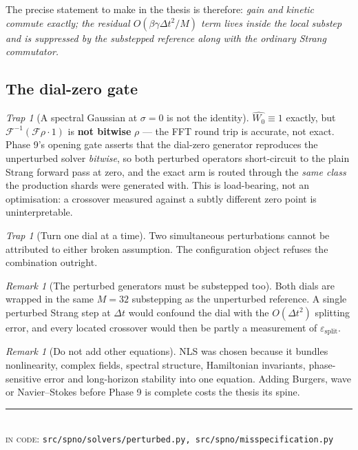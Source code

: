 \documentclass[11pt,a4paper]{article}
\theoremstyle{plain}
\theoremstyle{definition}
\theoremstyle{remark}
\newtheorem{remark}[theorem]{Remark}
\newtheorem{trap}[theorem]{Trap}
\newcommand{\dt}{\Delta t}
\newcommand{\epssplit}{\varepsilon_{\mathrm{split}}}
\newcommand{\src}[1]{{\color{linknavy}\texttt{\footnotesize #1}}}
\newcommand{\sourcenote}[1]{%
  \par\vspace{0.35em}\noindent
  {\footnotesize\color{rulegray}\rule{\linewidth}{0.4pt}\\[0.25em]
  \textsc{in code:} \src{#1}}\par\vspace{0.5em}}
\begin{document}
The precise statement to make in the thesis is therefore: \emph{gain and kinetic commute
exactly; the residual $O(\beta\gamma\dt^2/M)$ term lives inside the local substep and is
suppressed by the substepped reference along with the ordinary Strang commutator.}

\subsection{The dial-zero gate}

\begin{trap}[A spectral Gaussian at $\sigma=0$ is not the identity]
\label{trap:dialzero}
$\widehat{W_0}\equiv 1$ exactly, but $\mathcal{F}^{-1}(\mathcal{F}\rho \cdot 1)$ is
\textbf{not bitwise} $\rho$ --- the FFT round trip is accurate, not exact. Phase 9's
opening gate asserts that the dial-zero generator reproduces the unperturbed solver
\emph{bitwise}, so both perturbed operators short-circuit to the plain Strang forward pass
at zero, and the exact arm is routed through the \emph{same class} the production shards
were generated with. This is load-bearing, not an optimisation: a crossover measured
against a subtly different zero point is uninterpretable.
\end{trap}

\begin{trap}[Turn one dial at a time]
Two simultaneous perturbations cannot be attributed to either broken assumption. The
configuration object refuses the combination outright.
\end{trap}

\begin{remark}[The perturbed generators must be substepped too]
Both dials are wrapped in the same $M=32$ substepping as the unperturbed reference. A
single perturbed Strang step at $\dt$ would confound the dial with the $O(\dt^2)$
splitting error, and every located crossover would then be partly a measurement of
$\epssplit$.
\end{remark}

\begin{remark}[Do not add other equations]
NLS was chosen because it bundles nonlinearity, complex fields, spectral structure,
Hamiltonian invariants, phase-sensitive error and long-horizon stability into one
equation. Adding Burgers, wave or Navier--Stokes before Phase 9 is complete costs the
thesis its spine.
\end{remark}

\sourcenote{src/spno/solvers/perturbed.py, src/spno/misspecification.py}
\newpage
\end{document}
